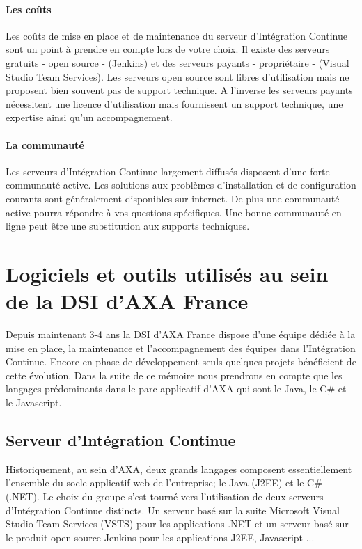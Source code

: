       \paragraph{Les coûts} Les coûts de mise en place et de maintenance du serveur d'Intégration Continue sont un point à prendre en compte lors de votre choix. Il existe des serveurs gratuits - open source - (Jenkins) et des serveurs payants - propriétaire - (Visual Studio Team Services). Les serveurs open source sont libres d'utilisation mais ne proposent bien souvent pas de support technique. A l'inverse les serveurs payants nécessitent une licence d'utilisation mais fournissent un support technique, une expertise ainsi qu'un accompagnement.

      \paragraph{La communauté} Les serveurs d'Intégration Continue largement diffusés disposent d'une forte communauté active. Les solutions aux problèmes d'installation et de configuration courants sont généralement disponibles sur internet. De plus une communauté active pourra répondre à vos questions spécifiques. Une bonne communauté en ligne peut être une substitution aux supports techniques.

  \section{Logiciels et outils utilisés au sein de la DSI d'AXA France}
  Depuis maintenant 3-4 ans la DSI d'AXA France dispose d'une équipe dédiée à la mise en place, la maintenance et l'accompagnement des équipes dans l'Intégration Continue. Encore en phase de développement seuls quelques projets bénéficient de cette évolution. Dans la suite de ce mémoire nous prendrons en compte que les langages prédominants dans le parc applicatif d'AXA qui sont le Java, le C\# et le Javascript.

    \subsection{Serveur d’Intégration Continue}
    Historiquement, au sein d'AXA, deux grands langages composent essentiellement l'ensemble du socle applicatif web de l'entreprise; le Java (J2EE) et le C\# (.NET). Le choix du groupe s'est tourné vers l'utilisation de deux serveurs d'Intégration Continue distincts. Un serveur basé sur la suite Microsoft Visual Studio Team Services (\gls{VSTS}) pour les applications .NET et un serveur basé sur le produit open source Jenkins pour les applications J2EE, Javascript ...\\


